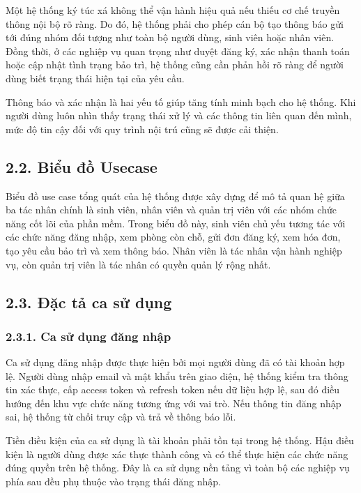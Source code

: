 \documentclass[12pt]{article}
\begin{document}
Một hệ thống ký túc xá không thể vận hành hiệu quả nếu thiếu cơ chế truyền thông nội bộ rõ ràng. Do đó, hệ thống phải cho phép cán bộ tạo thông báo gửi tới đúng nhóm đối tượng như toàn bộ người dùng, sinh viên hoặc nhân viên. Đồng thời, ở các nghiệp vụ quan trọng như duyệt đăng ký, xác nhận thanh toán hoặc cập nhật tình trạng bảo trì, hệ thống cũng cần phản hồi rõ ràng để người dùng biết trạng thái hiện tại của yêu cầu.

Thông báo và xác nhận là hai yếu tố giúp tăng tính minh bạch cho hệ thống. Khi người dùng luôn nhìn thấy trạng thái xử lý và các thông tin liên quan đến mình, mức độ tin cậy đối với quy trình nội trú cũng sẽ được cải thiện.

\subsection*{2.2. Biểu đồ Usecase}

Biểu đồ use case tổng quát của hệ thống được xây dựng để mô tả quan hệ giữa ba tác nhân chính là sinh viên, nhân viên và quản trị viên với các nhóm chức năng cốt lõi của phần mềm. Trong biểu đồ này, sinh viên chủ yếu tương tác với các chức năng đăng nhập, xem phòng còn chỗ, gửi đơn đăng ký, xem hóa đơn, tạo yêu cầu bảo trì và xem thông báo. Nhân viên là tác nhân vận hành nghiệp vụ, còn quản trị viên là tác nhân có quyền quản lý rộng nhất.

\subsection*{2.3. Đặc tả ca sử dụng}

\subsubsection*{2.3.1. Ca sử dụng đăng nhập}

Ca sử dụng đăng nhập được thực hiện bởi mọi người dùng đã có tài khoản hợp lệ. Người dùng nhập email và mật khẩu trên giao diện, hệ thống kiểm tra thông tin xác thực, cấp access token và refresh token nếu dữ liệu hợp lệ, sau đó điều hướng đến khu vực chức năng tương ứng với vai trò. Nếu thông tin đăng nhập sai, hệ thống từ chối truy cập và trả về thông báo lỗi.

Tiền điều kiện của ca sử dụng là tài khoản phải tồn tại trong hệ thống. Hậu điều kiện là người dùng được xác thực thành công và có thể thực hiện các chức năng đúng quyền trên hệ thống. Đây là ca sử dụng nền tảng vì toàn bộ các nghiệp vụ phía sau đều phụ thuộc vào trạng thái đăng nhập.
\end{document}
